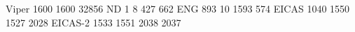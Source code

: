 Viper 1600 1600 32856
ND        1 8 427 662
ENG         893 10 1593 574
EICAS    1040 1550 1527 2028
EICAS-2  1533 1551 2038 2037
